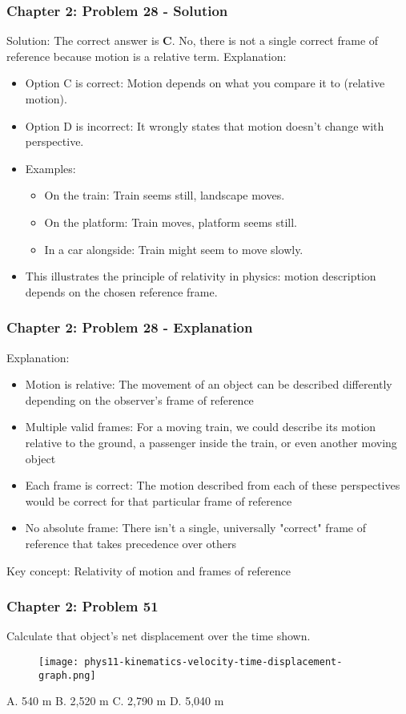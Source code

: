 \documentclass{beamer}
\begin{document}
\begin{frame}
\frametitle{Chapter 2: Problem 28 - Solution}
Solution: The correct answer is \textbf{C}. No, there is not a single correct frame of reference because motion is a relative term.
Explanation:
\begin{itemize}
\item Option C is correct: Motion depends on what you compare it to (relative motion).
\item Option D is incorrect: It wrongly states that motion doesn't change with perspective.
\item Examples:
\begin{itemize}
\item On the train: Train seems still, landscape moves.
\item On the platform: Train moves, platform seems still.
\item In a car alongside: Train might seem to move slowly.
\end{itemize}
\item This illustrates the principle of relativity in physics: motion description depends on the chosen reference frame.
\end{itemize}
\end{frame}
\begin{frame}
\frametitle{Chapter 2: Problem 28 - Explanation}
Explanation:
\begin{itemize}
    \item Motion is relative: The movement of an object can be described differently depending on the observer's frame of reference
    \item Multiple valid frames: For a moving train, we could describe its motion relative to the ground, a passenger inside the train, or even another moving object
    \item Each frame is correct: The motion described from each of these perspectives would be correct for that particular frame of reference
    \item No absolute frame: There isn't a single, universally "correct" frame of reference that takes precedence over others
\end{itemize}
Key concept: Relativity of motion and frames of reference
\end{frame}

\begin{frame}
\frametitle{Chapter 2: Problem 51}
Calculate that object's net displacement over the time shown.
\begin{figure}
    \centering
    \texttt{[image: phys11-kinematics-velocity-time-displacement-graph.png]}
\end{figure}

A. 540 m
B. 2,520 m
C. 2,790 m
D. 5,040 m
\end{frame}
\end{document}
